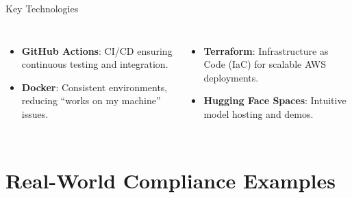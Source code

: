 \documentclass[aspectratio=169]{beamer}
\begin{document}
\begin{frame}{Key Technologies}
\begin{columns}[T,onlytextwidth]
\begin{itemize}
\item \textbf{GitHub Actions}: CI/CD ensuring continuous testing and integration.
\item \textbf{Docker}: Consistent environments, reducing “works on my machine” issues.
\end{itemize}

\begin{itemize}
\item \textbf{Terraform}: Infrastructure as Code (IaC) for scalable AWS deployments.
\item \textbf{Hugging Face Spaces}: Intuitive model hosting and demos.
\end{itemize}
\end{columns}
\end{frame}

\section{Real-World Compliance Examples}
\end{document}

